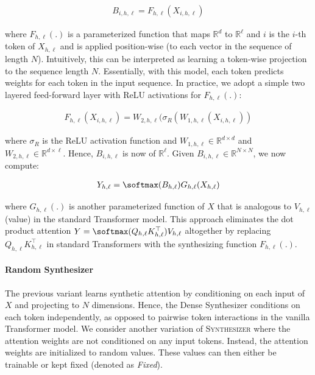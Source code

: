 \begin{align}
B_{i,h,\ell} = F_{h,\ell}(X_{i,h,\ell})     
\end{align}

where $F_{h,\ell}(.)$ is a parameterized function that maps $\mathbb{R}^{d}$ to $\mathbb{R}^{\ell}$ and $i$ is the $i$-th token of $X_{h,\ell}$ and is applied position-wise (to each vector in the sequence of length $N$). Intuitively, this can be interpreted as learning a token-wise projection to the sequence length $N$. Essentially, with this model, each token predicts weights for each token in the input sequence. In practice, we adopt a simple two layered feed-forward layer with ReLU activations for $F_{h,\ell}(.)$:

\begin{align}
F_{h,\ell}(X_{i,h,\ell}) = W_{2,h,\ell}(\sigma_{R}(W_{1,h,\ell}(X_{i,h,\ell}))   
\end{align}

where $\sigma_R$ is the ReLU activation function and $W_{1,h,\ell} \in \mathbb{R}^{d \times d}$ and $W_{2,h,\ell} \in \mathbb{R}^{d \times \ell}$. Hence, $B_{i,h,\ell}$ is now of $\mathbb{R}^{\ell}$. Given $B_{i,h,\ell} \in \mathbb{R}^{N \times N}$, we now compute:

\begin{align}
Y_{h,\ell} = \softmax(B_{h,\ell})G_{h,\ell}(X_{h,\ell})    
\end{align}

where $G_{h,\ell}(.)$ is another parameterized function of $X$ that is analogous to $V_{h,\ell}$ (value) in the standard Transformer model. This approach eliminates the dot product attention $Y = \softmax(Q_{h,\ell}K_{h,\ell}^\top)V_{h,\ell}$ altogether by replacing  $Q_{h,\ell}K_{h,\ell}^\top$ in standard Transformers with the synthesizing function $F_{h,\ell}(.)$. 

\paragraph{Random Synthesizer} The previous variant learns synthetic attention by conditioning on each input of $X$ and projecting to $N$ dimensions. Hence, the Dense Synthesizer conditions on each token independently, as opposed to pairwise token interactions in the vanilla Transformer model. We consider another variation of \textsc{Synthesizer} where the attention weights are not conditioned on any input tokens. Instead, the attention weights are initialized to random values. These values can then either be trainable or kept fixed (denoted as \textit{Fixed}).

